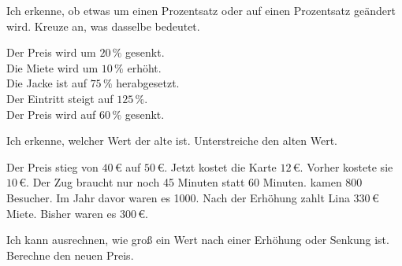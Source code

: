 \setcounter{aufgabe}{41}

\begin{aufgabe}{Ich erkenne, ob etwas um einen Prozentsatz oder auf einen Prozentsatz geändert wird.}
Kreuze an, was dasselbe bedeutet.
\begin{teile}
\teil Der Preis wird um $20\,\%$ gesenkt.\\ \quad {}\quad {}
\teil Die Miete wird um $10\,\%$ erhöht.\\ \quad {}\quad {}
\teil Die Jacke ist auf $75\,\%$ herabgesetzt.\\ \quad {}
\teil Der Eintritt steigt auf $125\,\%$.\\ \quad {}
\teil Der Preis wird auf $60\,\%$ gesenkt.\\ \quad {}
\end{teile}
\end{aufgabe}

\begin{aufgabe}{Ich erkenne, welcher Wert der alte ist.}
Unterstreiche den alten Wert.
\begin{teile}
\teil Der Preis stieg von $40\,€$ auf $50\,€$.
\teil Jetzt kostet die Karte $12\,€$. Vorher kostete sie $10\,€$.
\teil Der Zug braucht nur noch 45 Minuten statt 60 Minuten.
 kamen 800 Besucher. Im Jahr davor waren es 1000.
\teil Nach der Erhöhung zahlt Lina $330\,€$ Miete. Bisher waren es $300\,€$.
\end{teile}
\end{aufgabe}

\begin{aufgabe}{Ich kann ausrechnen, wie groß ein Wert nach einer Erhöhung oder Senkung ist.}
Berechne den neuen Preis.

\end{aufgabe}

